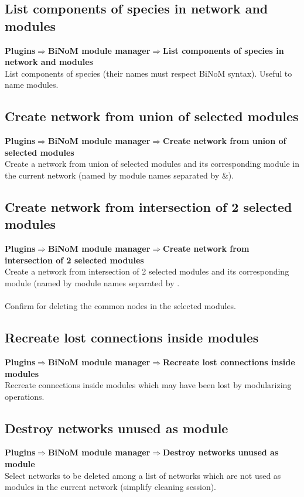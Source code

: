 \subsection{List components of species in network and modules}
\textbf{Plugins$\Rightarrow$BiNoM module manager$\Rightarrow$List components of species in network and modules}\\
List components of species (their names must respect BiNoM syntax). Useful to name modules.

\subsection{Create network from union of selected modules}
\textbf{Plugins$\Rightarrow$BiNoM module manager$\Rightarrow$Create network from union of selected modules}\\
Create a network from union of selected modules and its corresponding module in the current network (named by module names separated by \&).

\subsection{Create network from intersection of 2 selected modules}
\textbf{Plugins$\Rightarrow$BiNoM module manager$\Rightarrow$Create network from intersection of 2 selected modules}\\
Create a network from intersection of 2 selected modules and its corresponding module (named by module names separated by \textbar.\\\\
Confirm for deleting the common nodes in the selected modules.

\subsection{Recreate lost connections inside modules}
\textbf{Plugins$\Rightarrow$BiNoM module manager$\Rightarrow$Recreate lost connections inside modules}\\
Recreate connections inside modules which may have been lost by modularizing operations.

\subsection{Destroy networks unused as module}
\textbf{Plugins$\Rightarrow$BiNoM module manager$\Rightarrow$Destroy networks unused as module}\\
Select networks to be deleted among a list of networks which are not used as modules in the current network (simplify cleaning session).